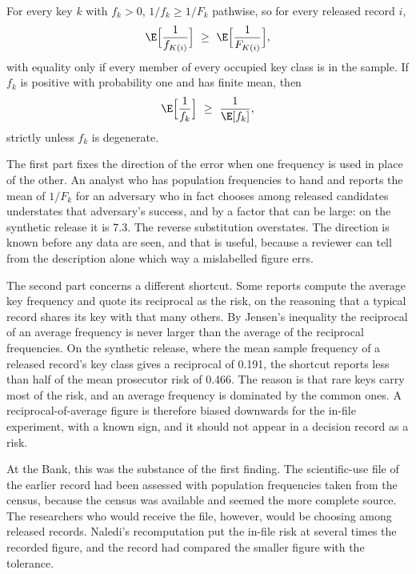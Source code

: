 \begin{proposition}\label{c03:prop-plugin}
For every key $k$ with $f_k > 0$, $1/f_k \ge 1/F_k$ pathwise, so for every released
record $i$,
\begin{equation}\label{c03:eq-order}
\E\Big[\frac{1}{f_{K(i)}}\Big] \ \ge\ \E\Big[\frac{1}{F_{K(i)}}\Big],
\end{equation}
with equality only if every member of every occupied key class is in the sample. If
$f_k$ is positive with probability one and has finite mean, then
\begin{equation}\label{c03:eq-jensen}
\E\Big[\frac{1}{f_k}\Big] \ \ge\ \frac{1}{\E[f_k]},
\end{equation}
strictly unless $f_k$ is degenerate.
\end{proposition}

The first part fixes the direction of the error when one frequency is used in place of
the other. An analyst who has population frequencies to hand and reports the mean of
$1/F_k$ for an adversary who in fact chooses among released candidates understates that
adversary's success, and by a factor that can be large: on the synthetic release it is
7.3. The reverse substitution overstates. The direction is known before any data are
seen, and that is useful, because a reviewer can tell from the description alone which
way a mislabelled figure errs.

The second part concerns a different shortcut. Some reports compute the average key
frequency and quote its reciprocal as the risk, on the reasoning that a typical record
shares its key with that many others. By Jensen's inequality the reciprocal of an
average frequency is never larger than the average of the reciprocal frequencies. On the
synthetic release, where the mean sample frequency of a released record's key class
gives a reciprocal of 0.191, the shortcut reports less than half of the mean prosecutor
risk of 0.466.
The reason is that rare keys carry most of the risk, and an average frequency is
dominated by the common ones. A reciprocal-of-average figure is therefore biased
downwards for the in-file experiment, with a known sign, and it should not appear in a
decision record as a risk.

At the Bank, this was the substance of the first finding. The scientific-use file of
the earlier record had been assessed with population frequencies taken from the census,
because the census was available and seemed the more complete source. The researchers
who would receive the file, however, would be choosing among released records. Naledi's
recomputation put the in-file risk at several times the recorded figure, and the record
had compared the smaller figure with the tolerance.

